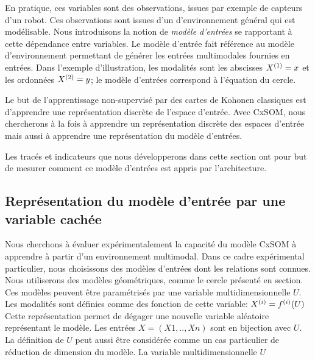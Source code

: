 En pratique, ces variables sont des observations, issues par exemple de capteurs d'un robot. Ces observations sont issues d'un d'environnement général qui est modélisable. 
Nous introduisons la notion de \emph{modèle d'entrées} se rapportant à cette dépendance entre variables.
Le modèle d'entrée fait référence au modèle d'environnement permettant de générer les entrées multimodales fournies en entrées. Dans l'exemple d'illustration, les modalités sont les abscisses $X^{({1})} = x$ et les ordonnées $X^{({2})} = y$; le modèle d'entrées correspond à l'équation du cercle.

Le but de l'apprentissage non-supervisé par des cartes de Kohonen classiques est d'apprendre une représentation discrète de l'espace d'entrée.
Avec CxSOM, nous chercherons à la fois à apprendre un représentation discrète des espaces d'entrée mais aussi à apprendre une représentation du modèle d'entrées.

Les tracés et indicateurs que nous développerons dans cette section ont pour but de mesurer comment ce modèle d'entrées est appris par l'architecture. 

\subsection{Représentation du modèle d'entrée par une variable cachée}

Nous cherchons à évaluer expérimentalement la capacité du modèle CxSOM à apprendre à partir d'un environnement multimodal. Dans ce cadre expérimental particulier, nous choisissons des modèles d'entrées dont les relations sont connues. 
Nous utiliserons des modèles géométriques, comme le cercle présenté en section. Ces modèles peuvent être paramétrisés par une variable multidimensionnelle $U$. Les modalités sont définies comme des fonction de cette variable:
$X^{({i})} = f^{({i})}(U)$
Cette représentation permet de dégager une nouvelle variable aléatoire représentant le modèle. Les entrées $X = (X1,..,Xn)$ sont en bijection avec $U$.
La définition de $U$ peut aussi être considérée comme un cas particulier de réduction de dimension du modèle. La variable multidimensionnelle $U$


